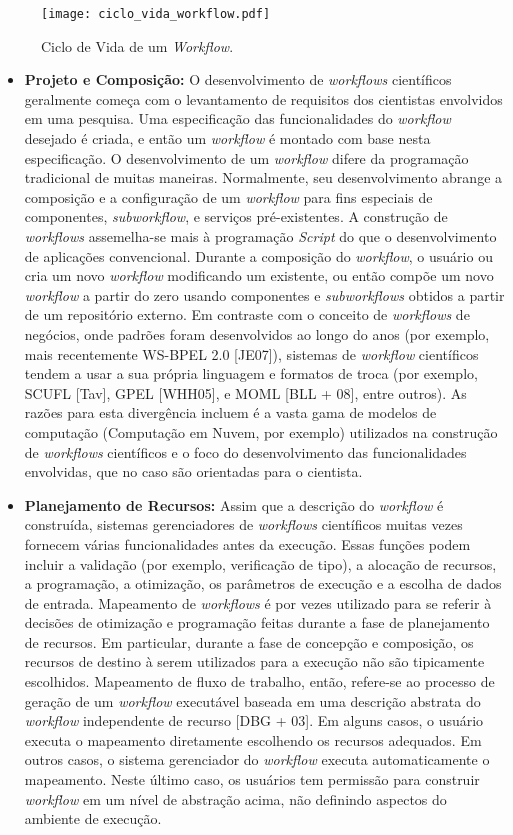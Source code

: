 \begin{figure}[H]
	\centering
	\texttt{[image: ciclo\_vida\_workflow.pdf]}
	\caption{Ciclo de Vida de um \textit{Workflow}.}
	\label{fig:ciclo_vida_workflow}
\end{figure}

\begin{itemize}
	\item \textbf{Projeto e Composição:} O desenvolvimento de \textit{workflows} científicos geralmente começa com o levantamento de requisitos dos cientistas envolvidos em uma pesquisa. Uma especificação das funcionalidades do \textit{workflow} desejado é criada, e então um \textit{workflow} é montado com base nesta especificação. O desenvolvimento de um \textit{workflow} difere da programação tradicional de muitas maneiras. Normalmente, seu desenvolvimento abrange a composição e a configuração de um \textit{workflow} para fins especiais de componentes, \textit{subworkflow}, e serviços pré-existentes. A construção de \textit{workflows} assemelha-se mais à programação \textit{Script} do que o desenvolvimento de aplicações convencional. Durante a composição do \textit{workflow}, o usuário ou cria um novo \textit{workflow} modificando um existente, ou então compõe um novo \textit{workflow} a partir do zero usando componentes e \textit{subworkflows} obtidos a partir de um repositório externo. Em contraste com o conceito de \textit{workflows} de negócios, onde padrões foram desenvolvidos ao longo do anos (por exemplo, mais recentemente WS-BPEL 2.0 [JE07]), sistemas de \textit{workflow} científicos tendem a usar a sua própria linguagem e formatos de troca (por exemplo, SCUFL [Tav], GPEL [WHH05], e MOML [BLL + 08], entre outros). As razões para esta divergência incluem é a vasta gama de modelos de computação (Computação em Nuvem, por exemplo) utilizados na construção de \textit{workflows} científicos e o foco do desenvolvimento das funcionalidades envolvidas, que no caso são orientadas para o cientista.
    \item \textbf{Planejamento de Recursos:} Assim que a descrição do \textit{workflow} é construída, sistemas gerenciadores de \textit{workflows} científicos muitas vezes fornecem várias funcionalidades antes da execução. Essas funções podem incluir a validação (por exemplo, verificação de tipo), a alocação de recursos, a programação, a otimização, os parâmetros de execução e a escolha de dados de entrada. Mapeamento de \textit{workflows} é por vezes utilizado para se referir à decisões de otimização e programação feitas durante a fase de planejamento de recursos. Em particular, durante a fase de concepção e composição, os recursos de destino à serem utilizados para a execução não são tipicamente escolhidos. Mapeamento de fluxo de trabalho, então, refere-se ao processo de geração de um \textit{workflow} executável baseada em uma descrição abstrata do \textit{workflow} independente de recurso [DBG + 03]. Em alguns casos, o usuário executa o mapeamento diretamente escolhendo os recursos adequados. Em outros casos, o sistema gerenciador do \textit{workflow} executa automaticamente o mapeamento. Neste último caso, os usuários tem permissão para construir \textit{workflow} em um nível de abstração acima, não definindo aspectos do ambiente de execução.

\end{itemize}
